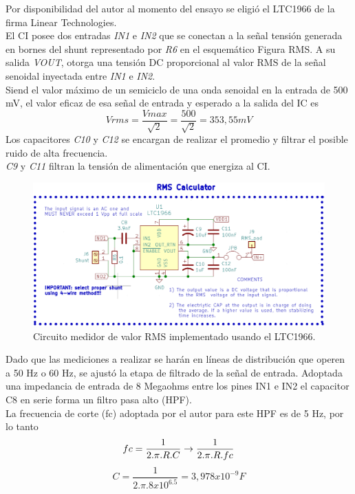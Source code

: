 Por disponibilidad del autor al momento del ensayo se eligió el LTC1966 de la firma Linear Technologies.\\
El CI posee dos entradas \textit{IN1} e \textit{IN2} que se conectan a la señal tensión generada en bornes del shunt representado por \textit{R6} en el esquemático Figura RMS. A su salida \textit{VOUT}, otorga una tensión DC proporcional al valor RMS de la señal senoidal inyectada entre \textit{IN1} e \textit{IN2}.\\
Siend el valor máximo de un semiciclo de una onda senoidal en la entrada de 500 mV, el valor eficaz de esa señal de entrada y esperado a la salida del IC es
\begin{equation}
	Vrms=\frac{Vmax}{\sqrt{2}}=\frac{500}{\sqrt{2}}= 353,55 mV
\end{equation}
Los capacitores \textit{C10} y \textit{C12} se encargan de realizar el promedio y filtrar el posible ruido de alta frecuencia.\\
\textit{C9} y \textit{C11} filtran la tensión de alimentación que energiza al CI.\\
\begin{figure}[h!]
	\centering
	\includegraphics[width=0.7\linewidth]{Figures/cto_medidor_rms}
	\caption{Circuito medidor de valor RMS implementado usando el LTC1966.}
	\label{fig:ctomedidorrms}
\end{figure}
Dado que las mediciones a realizar se harán en líneas de distribución que operen a 50 Hz o 60 Hz, se ajustó la etapa de filtrado de la señal de entrada. Adoptada una impedancia de entrada de 8 Megaohms entre los pines IN1 e IN2 el capacitor C8 en serie forma un filtro pasa alto (HPF).\\
La frecuencia de corte (fc) adoptada por el autor para este HPF es de 5 Hz, por lo tanto
\begin{equation}
	fc = \frac{1}{2.\pi.R.C}\rightarrow\frac{1}{2.\pi.R.fc}\\
\end{equation}
\begin{equation}
	C=\frac{1}{2.\pi.8x10^6.5}=3,978x10^{-9} F
\end{equation}
